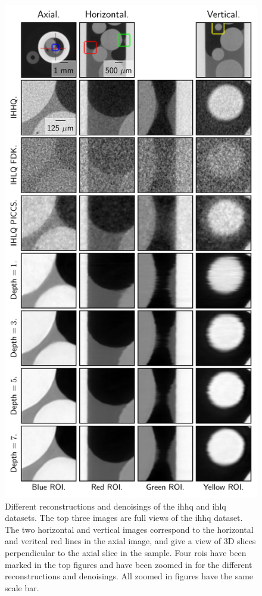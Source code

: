 \begin{figure}[htbp]
  \centering
  \includegraphics[width=.77\textwidth]{figures/bigfigure.pdf}
  \caption[Different reconstructions and denoisings of the IHLQ and IHHQ datasets]{Different reconstructions and denoisings of the \gls{ihhq} and \gls{ihlq} datasets. The top three images are full views of the \gls{ihhq} dataset. The two horizontal and vertical images correspond to the horizontal and veritcal red lines in the axial image, and give a view of 3D slices perpendicular to the axial slice in the sample. Four \glspl{roi} have been marked in the top figures and have been zoomed in for the different reconstructions and denoisings. All zoomed in figures have the same scale bar. }
  \label{fig:bigfigure}
\end{figure}

